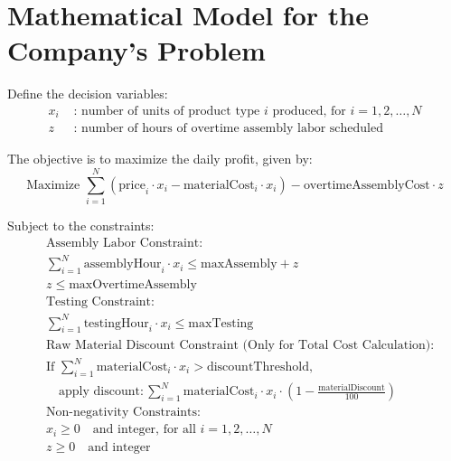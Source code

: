 \documentclass{article}
\begin{document}
\section*{Mathematical Model for the Company's Problem}

Define the decision variables:
\begin{align*}
    x_i & \text{ : number of units of product type } i \text{ produced, for } i = 1, 2, \ldots, N \\
    z   & \text{ : number of hours of overtime assembly labor scheduled}
\end{align*}

The objective is to maximize the daily profit, given by:
\[
\text{Maximize } \sum_{i=1}^{N} \left( \text{price}_i \cdot x_i - \text{materialCost}_i \cdot x_i \right) - \text{overtimeAssemblyCost} \cdot z
\]

Subject to the constraints:
\begin{align*}
    &\text{Assembly Labor Constraint:} \\
    & \sum_{i=1}^{N} \text{assemblyHour}_i \cdot x_i \leq \text{maxAssembly} + z \\
    &z \leq \text{maxOvertimeAssembly} \\
    &\text{Testing Constraint:} \\
    & \sum_{i=1}^{N} \text{testingHour}_i \cdot x_i \leq \text{maxTesting} \\
    &\text{Raw Material Discount Constraint (Only for Total Cost Calculation):} \\
    &\text{If } \sum_{i=1}^{N} \text{materialCost}_i \cdot x_i > \text{discountThreshold}, \\
    &\quad \text{apply discount}: \sum_{i=1}^{N} \text{materialCost}_i \cdot x_i \cdot \left(1 - \frac{\text{materialDiscount}}{100}\right) \\
    &\text{Non-negativity Constraints:} \\
    & x_i \geq 0 \quad \text{and integer, for all } i = 1, 2, \ldots, N \\
    & z \geq 0 \quad \text{and integer}
\end{align*}
\end{document}
